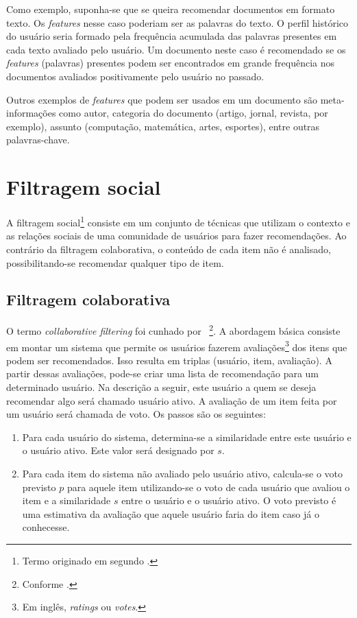 Como exemplo, suponha-se que se queira recomendar documentos em formato texto. Os \textit{features} nesse caso poderiam ser as palavras do texto. O perfil histórico do usuário seria formado pela frequência acumulada das palavras presentes em cada texto avaliado pelo usuário. Um documento neste caso é recomendado se os \textit{features} (palavras) presentes podem ser encontrados em grande frequência nos documentos avaliados positivamente pelo usuário no passado.

Outros exemplos de \textit{features} que podem ser usados em um documento são meta-informações como autor, categoria do documento (artigo, jornal, revista, por exemplo), assunto (computação, matemática, artes, esportes), entre outras palavras-chave.


\section{Filtragem social} %


A filtragem social\footnote{Termo originado em \cite{Malone87} segundo \cite{Hill95}.} consiste em um conjunto de técnicas que utilizam o contexto e as relações sociais de uma comunidade de usuários para fazer recomendações. Ao contrário da filtragem colaborativa, o conteúdo de cada item não é analisado, possibilitando-se recomendar qualquer tipo de item.

\subsection{Filtragem colaborativa}

O termo \textit{collaborative filtering} foi cunhado por \cite{Goldberg92}~\footnote{Conforme \cite{Resnick97}.}. A abordagem básica consiste em montar um sistema que permite os usuários fazerem avaliações\footnote{Em inglês, \textit{ratings} ou \textit{votes}.} dos itens que podem ser recomendados. Isso resulta em triplas (usuário, item, avaliação). A partir dessas avaliações, pode-se criar uma lista de recomendação para um determinado usuário. Na descrição a seguir, este usuário a quem se deseja recomendar algo será chamado usuário ativo. A avaliação de um item feita por um usuário será chamada de voto. Os passos são os seguintes:

\begin{enumerate}
\item 
Para cada usuário do sistema, determina-se a similaridade entre este usuário e o usuário ativo. Este valor será designado por $s$.

\item Para cada item do sistema não avaliado pelo usuário ativo, calcula-se o voto previsto $p$ para aquele item utilizando-se o voto de cada usuário que avaliou o item e a similaridade $s$ entre o usuário e o usuário ativo. O voto previsto é uma estimativa da avaliação que aquele usuário faria do item caso já o conhecesse.
\end{enumerate}

